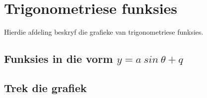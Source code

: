 \section{Trigonometriese funksies}
\nopagebreak
Hierdie afdeling beskryf die grafieke van trigonometriese funksies.\par 


\subsection{Funksies in die vorm $y=a~sin~\theta+q$}
\subsection*{Trek die grafiek}
\nopagebreak
